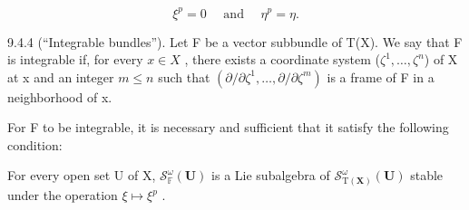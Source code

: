 \[
\xi^ {p} = 0 \quad \text { and } \quad \eta^ {p} = \eta .\tag{6}
\]

9.4.4 (“Integrable bundles”). Let F be a vector subbundle of T(X). We say that F is integrable if, for every \(x \in X\) , there exists a coordinate system (\(\zeta^{1}, \ldots, \zeta^{n}\)) of X at x and an integer \(m \leqslant n\) such that \((\partial/\partial\zeta^{1}, \ldots, \partial/\partial\zeta^{m})\) is a frame of F in a neighborhood of x.

For F to be integrable, it is necessary and sufficient that it satisfy the following condition:

For every open set U of X, \(\mathcal{S}_{\mathbb{F}}^{\omega}(\mathbf{U})\) is a Lie subalgebra of \(\mathcal{S}_{\mathrm{T}(\mathbf{X})}^{\omega}(\mathbf{U})\) stable under the operation \(\xi \mapsto \xi^{p}\) .

